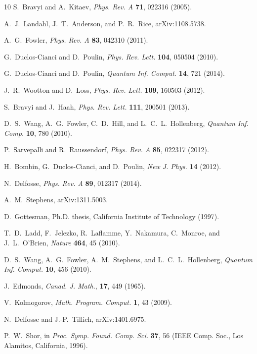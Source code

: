 \documentclass[letterpaper,showpacs,superscriptaddress,twocolumn,aps,prl]{revtex4-1}
\begin{document}
\begin{thebibliography}{10}
S.~Bravyi and A.~Kitaev, {\it Phys. Rev. A} {\bf 71}, 022316 (2005).

A.~J.~Landahl, J.~T.~Anderson, and P.~R.~Rice, arXiv:1108.5738.

A.~G.~Fowler, {\it Phys. Rev. A} {\bf 83}, 042310 (2011).

G.~Duclos-Cianci and D.~Poulin, {\it Phys. Rev. Lett.} {\bf 104}, 050504 (2010).

G.~Duclos-Cianci and D.~Poulin, {\it Quantum Inf. Comput.} {\bf 14}, 721 (2014).

J.~R.~Wootton and D.~Loss, {\it Phys. Rev. Lett.} {\bf 109}, 160503 (2012).

S.~Bravyi and J.~Haah, {\it Phys. Rev. Lett.} {\bf 111}, 200501 (2013).

D.~S.~Wang, A.~G.~Fowler, C.~D.~Hill, and L.~C.~L.~Hollenberg, {\it Quantum Inf. Comp.} {\bf 10}, 780 (2010).

P.~Sarvepalli and R.~Raussendorf, {\it Phys. Rev. A} {\bf 85}, 022317 (2012).

H.~Bombin, G.~Duclos-Cianci, and D.~Poulin, {\it New J. Phys.} {\bf 14} (2012).

N.~Delfosse, {\it Phys. Rev. A} {\bf 89}, 012317 (2014).

A.~M.~Stephens, arXiv:1311.5003.

D.~Gottesman, Ph.D. thesis, California Institute of Technology (1997).

T.~D.~Ladd, F.~Jelezko, R.~Laflamme, Y.~Nakamura, C.~Monroe, and J.~L.~O'Brien, {\it Nature} {\bf 464}, 45 (2010). 

D.~S.~Wang, A.~G.~Fowler, A.~M.~Stephens, and L.~C.~L.~Hollenberg, {\it Quantum Inf. Comput.} \textbf{10}, 456 (2010).

J.~Edmonds, {\it Canad. J. Math.}, {\bf 17}, 449 (1965).

V.~Kolmogorov, {\it Math. Program. Comput.} {\bf 1}, 43 (2009).

N.~Delfosse and J.-P.~Tillich, arXiv:1401.6975.

P.~W.~Shor, in {\it Proc. Symp. Found. Comp. Sci.} {\bf 37}, 56 (IEEE Comp. Soc., Los Alamitos, California, 1996).


\end{thebibliography}
\end{document}
